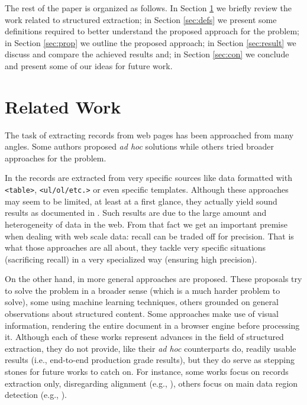 The rest of the paper is organized as follows. In Section \ref{sec:work} we
briefly review the work related to structured extraction; in Section
\ref{sec:defs} we present some definitions required to better understand the
proposed approach for the problem; in Section \ref{sec:prop} we outline the
proposed approach; in Section \ref{sec:result} we discuss and compare the
achieved results and; in Section \ref{sec:con} we conclude and present some
of our ideas for future work.

\section{Related Work}\label{sec:work}

The task of extracting records from web pages has been approached from many
angles. Some authors proposed \textit{ad hoc} solutions while others tried 
broader approaches for the problem.

In \cite{webtables2008, listExtract2009, tablesMS2012, tegra2015, qiu2015dexter,
topklists2013} the records %
are extracted from very
specific sources like data formatted with \texttt{<table>},
\texttt{<ul/ol/etc.>} or even specific templates. Although these approaches may
seem to be limited, at least at a first glance, they actually yield sound
results as documented in \cite{relationalWeb2008, probase2012, acsdb}.
Such results are due to the large amount and heterogeneity of data in the web.
From that fact we get an important premise when dealing with web scale data:
recall can be traded off for precision. That is what those approaches are
all about, they tackle very specific situations (sacrificing recall) in a very
specialized way (ensuring high precision).

On the other hand, in \cite{RRunner01, exalg2003, vips03, viper05, MDR03,
depta05, NET05, TPC09, vide10, gstm2010, fivatech2010, SuffixTree12,
grigalis2013towards, autorm2015,cortez2010ondux} more general approaches are
proposed.
These proposals try to solve the problem in a broader sense (which is a much
harder problem to solve), some using machine learning
techniques\cite{RRunner01,fivatech2010,grigalis2013towards,cortez2010ondux}, others
grounded on general observations about structured
content\cite{MDR03,exalg2003,NET05,depta05,TPC09,gstm2010,SuffixTree12,autorm2015}.
Some approaches make use of visual information, rendering the entire document in
a browser engine before processing
it\cite{vips03,viper05,depta05,vide10,grigalis2013towards}.
Although each of these works represent advances in the field of structured
extraction, they do not provide, like their \textit{ad hoc} counterparts do,
readily usable results (i.e., end-to-end production grade results), but they do
serve as stepping stones for future works to catch on. For instance, some works
focus on records extraction only, disregarding alignment (e.g., \cite{TPC09}),
others focus on main data region detection (e.g., \cite{vips03}).


